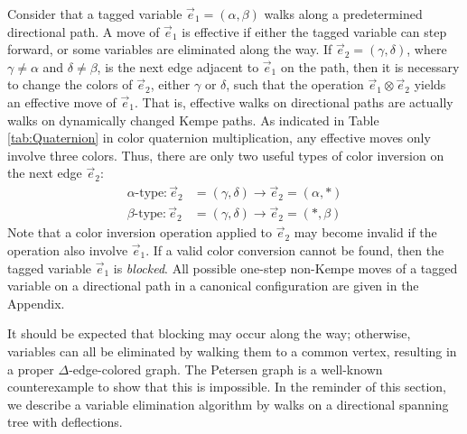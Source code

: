 \documentclass[11pt]{article}
\begin{document}
Consider that a tagged variable $\vec{e}_1=(\alpha,\beta)$  walks along a predetermined directional path. A move of  $\vec{e}_1$  is effective if either the tagged variable can step forward, or some variables are eliminated along the way. If $\vec{e}_2=(\gamma,\delta)$, where $\gamma \neq \alpha $ and $\delta \neq \beta$, is the next edge adjacent to $\vec{e}_1$ on the path, then it is necessary to change the colors of $\vec{e}_2$, either $\gamma$ or $\delta$, such that the operation $\vec{e}_1 \otimes \vec{e}_2$ yields an effective move of $\vec{e}_1$. That is, effective walks on directional paths are actually walks on dynamically changed Kempe paths. As indicated in Table \ref{tab:Quaternion} in color quaternion multiplication, any effective moves only involve three colors. Thus, there are only two useful types of color inversion on the next edge $\vec{e}_2$: 
\begin{align}
\alpha \mbox{-type}: \vec{e}_2 & =(\gamma,\delta) \rightarrow \vec{e}_2=(\alpha,*) \nonumber \\ 
\beta \mbox{-type}: \vec{e}_2 & =(\gamma,\delta) \rightarrow \vec{e}_2=(*,\beta) \nonumber 
\end{align}
Note that a color inversion operation applied to $\vec{e}_2$ may become invalid if the operation also involve $\vec{e}_1$. If a valid color conversion cannot be found, then the tagged variable $\vec{e}_1$ is {\it blocked}. All possible one-step non-Kempe moves of a tagged variable on a directional path in a canonical configuration are given in the Appendix.

It should be expected that blocking may occur along the way; otherwise, variables can all be eliminated by walking them to a common vertex, resulting in a proper $\Delta$-edge-colored graph. The Petersen graph is a well-known counterexample to show that this is impossible. In the reminder of this section, we describe a variable elimination algorithm by walks on a directional spanning tree with deflections.
\end{document}
